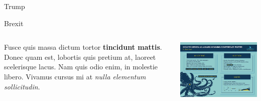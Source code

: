 \documentclass[final]{beamer}
\newlength{\twocolwid}
\begin{document}
\begin{frame}[t]
\begin{columns}[t]
\begin{column}{\twocolwid}
\begin{block}{Trump}
\end{block}


\begin{block}{Brexit}


    \begin{columns}[onlytextwidth]
        \begin{column}{.55\textwidth}
            Fusce quis massa dictum tortor \textbf{tincidunt mattis}. Donec quam est, lobortis quis pretium at, laoreet scelerisque lacus. Nam quis odio enim, in molestie libero. Vivamus cursus mi at \textit{nulla elementum sollicitudin}.
        \end{column}
        \begin{column}{.45\textwidth}
            \includegraphics[width=0.8\linewidth]{design_guidelines.png} 
        \end{column}
    \end{columns}

\end{block}



\end{column}
\end{columns}
\end{frame}
\end{document}

